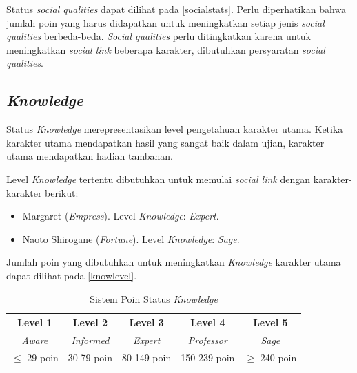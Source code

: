 Status \textit{social qualities} dapat dilihat pada \autoref{socialstats}. Perlu diperhatikan bahwa jumlah poin yang harus didapatkan untuk meningkatkan setiap jenis \textit{social qualities} berbeda-beda. \textit{Social qualities} perlu ditingkatkan karena untuk meningkatkan \textit{social link} beberapa karakter, dibutuhkan persyaratan \textit{social qualities}.

\subsection{\textit{Knowledge}}
Status \textit{Knowledge} merepresentasikan level pengetahuan karakter utama. Ketika karakter utama mendapatkan hasil yang sangat baik dalam ujian, karakter utama mendapatkan hadiah tambahan.

Level \textit{Knowledge} tertentu dibutuhkan untuk memulai \textit{social link} dengan karakter-karakter berikut:
\begin{itemize}
    \item Margaret (\textit{Empress}). Level \textit{Knowledge}: \textit{Expert}.
    \item Naoto Shirogane (\textit{Fortune}). Level \textit{Knowledge}: \textit{Sage}.
\end{itemize}

Jumlah poin yang dibutuhkan untuk meningkatkan \textit{Knowledge} karakter utama dapat dilihat pada \autoref{knowlevel}.
\begin{table}[H]
    \caption{\label{knowlevel}Sistem Poin Status \textit{Knowledge}}
    \begin{center}
        \begin{tabular}{ | c | c | c | c | c | }
            \hline
            \textbf{Level 1} & \textbf{Level 2}  & \textbf{Level 3} & \textbf{Level 4}   & \textbf{Level 5} \\
            \hline
            \textit{Aware}   & \textit{Informed} & \textit{Expert}  & \textit{Professor} & \textit{Sage}    \\
            \hline
            $\le$ 29 poin    & 30-79 poin        & 80-149 poin      & 150-239 poin       & $\ge$ 240 poin   \\
            \hline
        \end{tabular}
    \end{center}
\end{table}

